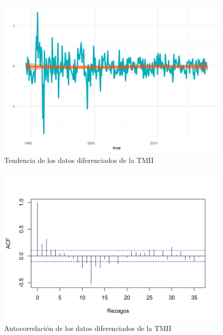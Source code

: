 \documentclass[
]{article}
\begin{document}
\begin{figure}[H]
\includegraphics[width=1\linewidth,height=1\textheight]{Tesis_files/figure-latex/tmii_comportamiento-1} \caption{Tendencia de los datos diferenciados de la TMII}\label{fig:tmii_comportamiento}
\end{figure}

\begin{figure}[H]
\includegraphics[width=1\linewidth,height=1\textheight]{Tesis_files/figure-latex/tmii_acf-1} \caption{Autocorrelación de los datos diferenciados de la TMII}\label{fig:tmii_acf}
\end{figure}
\end{document}
